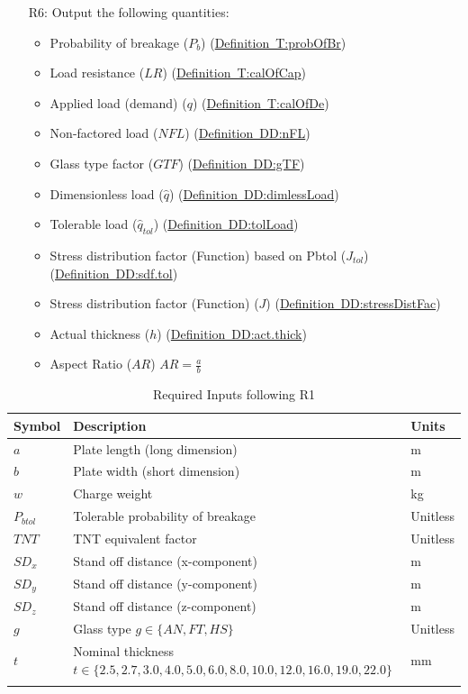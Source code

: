 \documentclass[12pt]{article}
\begin{document}
\begin{itemize}
\item[R6:]Output the following quantities:
          \begin{itemize}
          \item{Probability of breakage (${P_{b}}$) (\hyperref[T:probOfBr]{Definition~T:probOfBr})}
          \item{Load resistance ($LR$) (\hyperref[T:calOfCap]{Definition~T:calOfCap})}
          \item{Applied load (demand) ($q$) (\hyperref[T:calOfDe]{Definition~T:calOfDe})}
          \item{Non-factored load ($NFL$) (\hyperref[DD:nFL]{Definition~DD:nFL})}
          \item{Glass type factor ($GTF$) (\hyperref[DD:gTF]{Definition~DD:gTF})}
          \item{Dimensionless load ($\hat{q}$) (\hyperref[DD:dimlessLoad]{Definition~DD:dimlessLoad})}
          \item{Tolerable load (${\hat{q}_{tol}}$) (\hyperref[DD:tolLoad]{Definition~DD:tolLoad})}
          \item{Stress distribution factor (Function) based on Pbtol (${J_{tol}}$) (\hyperref[DD:sdf.tol]{Definition~DD:sdf.tol})}
          \item{Stress distribution factor (Function) ($J$) (\hyperref[DD:stressDistFac]{Definition~DD:stressDistFac})}
          \item{Actual thickness ($h$) (\hyperref[DD:act.thick]{Definition~DD:act.thick})}
          \item{Aspect Ratio ($AR$) $AR=\frac{a}{b}$}
          \end{itemize}
\end{itemize}
\begin{longtabu}{l X[l] l}
\toprule
Symbol & Description & Units
\\
\midrule
$a$ & Plate length (long dimension) & m
\\
$b$ & Plate width (short dimension) & m
\\
$w$ & Charge weight & kg
\\
${P_{btol}}$ & Tolerable probability of breakage & Unitless
\\
$TNT$ & TNT equivalent factor & Unitless
\\
${SD_{x}}$ & Stand off distance (x-component) & m
\\
${SD_{y}}$ & Stand off distance (y-component) & m
\\
${SD_{z}}$ & Stand off distance (z-component) & m
\\
$g$ & Glass type $g\in{}\{AN,FT,HS\}$ & Unitless
\\
$t$ & Nominal thickness $t\in{}\{2.5,2.7,3.0,4.0,5.0,6.0,8.0,10.0,12.0,16.0,19.0,22.0\}$ & mm
\\
\bottomrule
\caption{Required Inputs following R1}
\label{Table:R1ReqInputs}
\end{longtabu}
\end{document}
